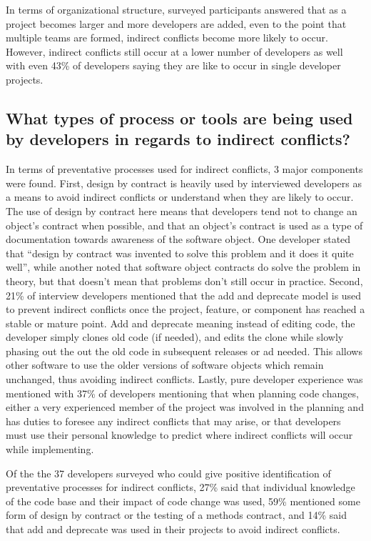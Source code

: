 \documentclass[conference]{IEEEtran}
\begin{document}
In terms of organizational structure, surveyed participants answered that as a project becomes larger and more 
developers are added, even to the point that multiple teams are formed, indirect conflicts become more likely to
occur. However, indirect conflicts still occur at a lower number of developers as well with even 43\% of developers
saying they are like to occur in single developer projects.

\subsection{What types of process or tools are being used by developers in regards to indirect conflicts?}

In terms of preventative processes used for indirect conflicts, 3 major components were found.
First, design by contract is heavily used by interviewed developers as a means to avoid indirect conflicts or understand
when they are likely to occur. The use of design by contract here means that developers tend not to change an object's
contract when possible, and that an object's contract is used as a type of documentation towards awareness of the 
software object. One developer stated that ``design by contract was invented to solve this problem and it does it 
quite well'', while another noted that software object contracts do solve the problem in theory, but that doesn't 
mean that problems don't still occur in practice.
Second, 21\% of interview developers mentioned that the add and deprecate 
model is used to prevent indirect conflicts once
the project, feature, or component has reached a stable or mature point.
Add and deprecate meaning instead of editing code, the developer simply clones old code (if needed), and edits the clone
while slowly phasing out the out the old code in subsequent releases or ad needed. This allows other software to 
use the older versions of software objects which remain unchanged, thus avoiding indirect conflicts.
Lastly, pure developer experience was mentioned with 37\% of developers mentioning that when planning code changes, 
either a very experienced member of the project was involved in the planning and has duties to foresee any 
indirect conflicts that may arise, or that developers must use their personal knowledge to predict where indirect 
conflicts will occur while implementing.

Of the the 37 developers surveyed who could give positive identification of preventative processes for indirect conflicts,
27\% said that individual knowledge of the code base and their impact of code change was used, 59\% mentioned some form of design
by contract or the testing of a methods contract, and 14\% said that add and
deprecate was used in their projects to avoid indirect conflicts.
\end{document}
